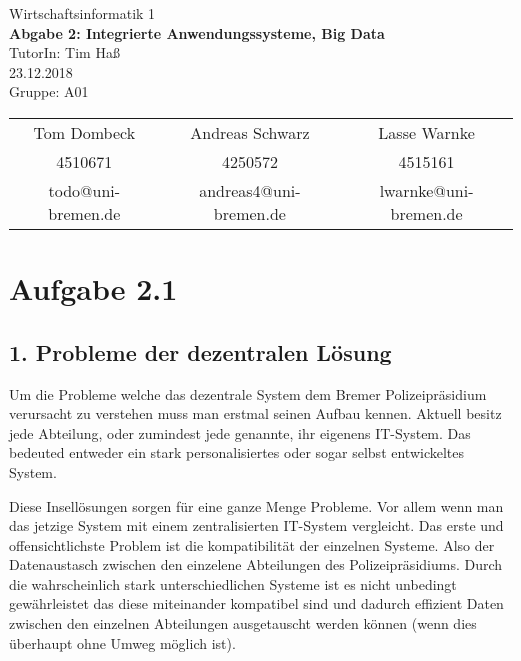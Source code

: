 \documentclass[12pt,utf8]{scrartcl}
\makeatletter
\newcommand{\teilnehmerI}{Tom Dombeck}
\newcommand{\mattI}{4510671}
\newcommand{\mailI}{todo@uni-bremen.de}
\newcommand{\teilnehmerII}{Andreas Schwarz}
\newcommand{\mattII}{4250572}
\newcommand{\mailII}{andreas4@uni-bremen.de}
\newcommand{\teilnehmerIII}{Lasse Warnke}
\newcommand{\mattIII}{4515161}
\newcommand{\mailIII}{lwarnke@uni-bremen.de}
\newcommand{\thisgroup}{A01}
\newcommand{\abgabedatum}{23.12.2018}
\newcommand{\nummer}{2}
\newcommand{\thema}{Integrierte Anwendungssysteme, Big Data}
\newcommand{\thistutor}{Tim Haß}
\newcommand{\thiscourse}{Wirtschaftsinformatik 1}
\makeatother
\begin{document}
\begin{titlepage}
	\vspace*{\baselineskip}		
	\centering					
	\LARGE							
	\thiscourse \\ 					
	\vspace{1cm}					
	{\Huge 							
	\textbf{Abgabe \nummer: \thema}} \\ 
	\vspace{1.5cm} 					
	TutorIn: \thistutor \\ 		
	\abgabedatum \\ 				
	\vfill 							
	Gruppe: \thisgroup \\ 			
	\vspace{.5cm} 					
	\large 							
	\begin{tabular}{c|c|c} 		
	\teilnehmerI	& \teilnehmerII & \teilnehmerIII \\ 
	\mattI	& \mattII &  \mattIII\\ 
	\mailI	& \mailII & \mailIII \\ 
	\end{tabular} 
\end{titlepage}

\thispagestyle{empty}
\tableofcontents
\newpage
\setcounter{page}{1}

\section*{Aufgabe 2.1}
\subsection*{\label{sub:thema}1. Probleme der dezentralen Lösung}

Um die Probleme welche das dezentrale System dem Bremer Polizeipräsidium verursacht zu verstehen muss man erstmal seinen Aufbau kennen. Aktuell besitz jede Abteilung, oder zumindest jede genannte, ihr eigenens IT-System. Das bedeuted entweder ein stark personalisiertes oder sogar selbst entwickeltes System. 

Diese Insellösungen sorgen für eine ganze Menge Probleme. Vor allem wenn man das jetzige System mit einem zentralisierten IT-System vergleicht. 
Das erste und offensichtlichste Problem ist die kompatibilität der einzelnen Systeme. Also der Datenaustasch zwischen den einzelene Abteilungen des Polizeipräsidiums. Durch die wahrscheinlich stark unterschiedlichen Systeme ist es nicht unbedingt gewährleistet das diese miteinander kompatibel sind und dadurch effizient Daten zwischen den einzelnen Abteilungen ausgetauscht werden können (wenn dies überhaupt ohne Umweg möglich ist).
\end{document}

